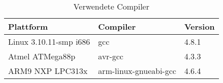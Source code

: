 \begin{table}[h]
\begin{tabular}{|p{4.5cm}|p{4cm}|p{4cm}|}\hline
\rowcolor{TableBackgroundColor} 
\textbf{Plattform}		&	\textbf{Compiler}		&	\textbf{Version}  \\ \hline
 Linux 3.10.11-smp i686	&	gcc						& 4.8.1	\\ \hline
 Atmel ATMega88p		&	avr-gcc					& 4.3.3	\\ \hline
 ARM9 NXP LPC313x		&	arm-linux-gnueabi-gcc	& 4.6.4	\\ \hline
\end{tabular}
\caption{Verwendete Compiler}
\label{tab:verwendete_compiler}
\end{table}



